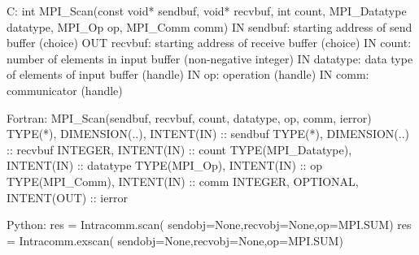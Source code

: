 C:
int MPI_Scan(const void* sendbuf, void* recvbuf,
    int count, MPI_Datatype datatype, MPI_Op op, MPI_Comm comm)
IN sendbuf: starting address of send buffer (choice)
OUT recvbuf: starting address of receive buffer (choice)
IN count: number of elements in input buffer (non-negative integer)
IN datatype: data type of elements of input buffer (handle)
IN op: operation (handle)
IN comm: communicator (handle)

Fortran:
MPI_Scan(sendbuf, recvbuf, count, datatype, op, comm, ierror)
TYPE(*), DIMENSION(..), INTENT(IN) :: sendbuf
TYPE(*), DIMENSION(..) :: recvbuf
INTEGER, INTENT(IN) :: count
TYPE(MPI_Datatype), INTENT(IN) :: datatype
TYPE(MPI_Op), INTENT(IN) :: op
TYPE(MPI_Comm), INTENT(IN) :: comm
INTEGER, OPTIONAL, INTENT(OUT) :: ierror

Python:
res = Intracomm.scan( sendobj=None,recvobj=None,op=MPI.SUM)
res = Intracomm.exscan( sendobj=None,recvobj=None,op=MPI.SUM)
